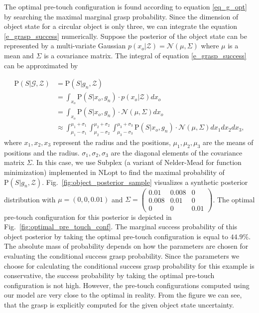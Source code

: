 The optimal pre-touch configuration is found according to equation \ref{eq_g_opt} by searching the maximal marginal grasp probability. Since the dimension of object state for a circular object is only three, we can integrate the equation \ref{e_grasp_success} numerically. Suppose the posterior of the object state can be represented by a multi-variate Gaussian $p(x_o|\mathcal{Z}) = \mathcal{N}(\mu, \Sigma)$ where $\mu$ is a mean and $\Sigma$ is a covariance matrix. The integral of equation  \ref{e_grasp_success} can be approximated by 

\begin{equation}
\begin{split}
 \text{P}(S | \mathcal{G} ,\mathcal{Z}) &= \text{P}(S | g_n ,\mathcal{Z}) \\
    &= \int_{x_o} \text{P} (S | x_o, g_n )\cdot p(x_o|\mathcal{Z}) dx_o \\
    &=  \int_{x_o} \text{P} (S | x_o, g_n )\cdot \mathcal{N}(\mu, \Sigma) dx_o  \\
    &\approx \int_{\mu_1 - \sigma_1}^{\mu_1 + \sigma_1} \int_{\mu_2 - \sigma_2}^{\mu_2 + \sigma_2} \int_{\mu_3 - \sigma_3}^{\mu_3 + \sigma_3} \text{P} (S | x_{o},  g_n )\cdot \mathcal{N}(\mu, \Sigma)  dx_{1} dx_{2} dx_{3}, 
\label{e_grasp_success}
\end{split}
\end{equation}
where $x_{1}, x_{2}, x_{3} $ represent the radius and the positions, $\mu_1, \mu_2, \mu_3$ are the means of positions and the radius. $\sigma_1, \sigma_2, \sigma_3$ are the diagonal elements of the covariance matrix $\Sigma$. In this case, we use Subplex \todo{[cite]\cite{}}(a variant of Nelder-Mead for function minimization) implemented in NLopt \todo{[cite]\cite{}} to find the maximal probability of $\text{P}(S | g_n ,\mathcal{Z})$. Fig.~\ref{fig:object_posterior_sample} visualizes a synthetic posterior distribution   with $\mu = (0, 0 , 0.01)$ and $
\Sigma = 
\begin{pmatrix}
0.01 & 0.008  & 0 \\ 
0.008 & 0.01  & 0 \\
0 & 0  & 0.01
\end{pmatrix}
$. The optimal pre-touch configuration for this posterior is depicted in Fig.~\ref{fig:optimal_pre_touch_conf}. The marginal success probability of this object posterior by taking the optimal pre-touch configuration is equal to $44.9 \%$. The absolute mass of probability depends on how the parameters are chosen for evaluating the conditional success grasp probability. Since the parameters we choose for calculating the conditional success grasp probability for this example is conservative, the success probability by taking the optimal pre-touch configuration is not high. However, the pre-touch configurations computed using our model are very close to the optimal in reality. From the figure we can see, that the grasp is explicitly computed for the given object state uncertainty. 

